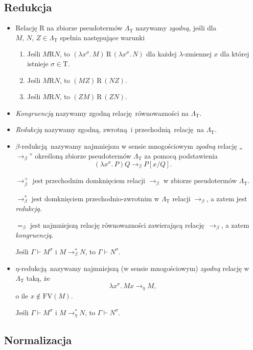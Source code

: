 \subsection{Redukcja}
\begin{definicja}
\begin{itemize}

  \item Relację \(\mathrm{R}\) na zbiorze pseudotermów \(\Lambda_{\mathrm{T}}\) nazywamy \emph{zgodną}, jeśli dla \(M,\,N,\,Z\in\Lambda_{\mathrm{T}}\) spełnia następujące warunki

  \begin{enumerate}[label=({\alph*})]
    \item Jeśli \(M\mathrm{R} N\), to \((\lambda x^\sigma.\,M)\, \mathrm{R}\, (\lambda x^\sigma.\, N)\) dla każdej \(\lambda\)-zmiennej \(x\) dla której istnieje \(\sigma\in \mathrm{T}\).
    \item Jeśli \(M\mathrm{R} N\), to \((MZ)\,\mathrm{R}\, (NZ)\).
    \item Jeśli \(M\mathrm{R} N\), to \((ZM)\,\mathrm{R}\, (ZN)\).
  \end{enumerate}
  \item \emph{Kongruencją} nazywamy zgodną relację równowazności na \(\Lambda_{\mathrm{T}}\).
  \item \emph{Redukcją} nazywamy zgodną, zwrotną i przechodnią relację na \(\Lambda_{\mathrm{T}}\).

\item \(\beta\)-redukcją nazywamy najmniejsza w sensie mnogościowym \emph{zgodną} relację „\(\longrightarrow_{\beta}\)” określoną zbiorze pseudotermów \(\Lambda_{\mathrm{T}}\) za pomocą podstawienia
  \[
    (\lambda x^\sigma.\,P)Q \longrightarrow_{\beta} P[x/Q].
  \]


    \(\longrightarrow^{+}_{\beta}\) jest przechodnim domknięciem relacji \(\longrightarrow_{\beta}\) w zbiorze pseudotermów \(\Lambda_{\mathrm{T}}\).

    \(\longrightarrow^{*}_{\beta}\) jest domknięciem przechodnio-zwrotnim w \(\Lambda_{\mathrm{T}}\) relacji \(\longrightarrow_{\beta}\), a zatem jest \emph{redukcją}. 

    \(=_{\beta}\) jest najmniejszą relację równowazności zawierającą relację \(\longrightarrow_{\beta}\), a zatem \emph{kongruencją}.


  \begin{fakt}
    Jeśli \(\Gamma\vdash M^\sigma\) i \(M\longrightarrow^{*}_{\beta}N\), to
    \(\Gamma\vdash N^\sigma\).
  \end{fakt}
\item \(\eta\)-redukcją nazywamy najmniejszą (w sensie mnogościowym) \emph{zgodną} relację w \(\Lambda_{\mathrm{T}}\) taką, że
  \[
    \lambda x^\sigma.\, Mx\longrightarrow_{\eta} M,
  \]
    o ile \(x\not\in \mathrm{FV}(M)\).

  \begin{fakt}
    Jeśli \(\Gamma\vdash M^\sigma\) i \(M\longrightarrow^{*}_{\eta}N\), to
    \(\Gamma\vdash N^\sigma\).
  \end{fakt}

\end{itemize}
\end{definicja}
\subsection{Normalizacja}
